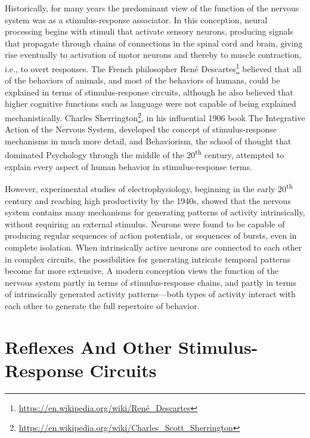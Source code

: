 \documentclass[]{book}
\let\rmarkdownfootnote\footnote%
\def\footnote{\protect\rmarkdownfootnote}
\renewcommand{\href}[2]{#2\footnote{\url{#1}}}
\begin{document}
Historically, for many years the predominant view of the function of the nervous system was as a stimulus-response associator. In this conception, neural processing begins with stimuli that activate sensory neurons, producing signals that propagate through chains of connections in the spinal cord and brain, giving rise eventually to activation of motor neurons and thereby to muscle contraction, i.e., to overt responses. The French philosopher \href{https://en.wikipedia.org/wiki/René_Descartes}{René Descartes} believed that all of the behaviors of animals, and most of the behaviors of humans, could be explained in terms of stimulus-response circuits, although he also believed that higher cognitive functions such as language were not capable of being explained mechanistically. \href{https://en.wikipedia.org/wiki/Charles_Scott_Sherrington}{Charles Sherrington}, in his influential 1906 book The Integrative Action of the Nervous System, developed the concept of stimulus-response mechanisms in much more detail, and Behaviorism, the school of thought that dominated Psychology through the middle of the 20\textsuperscript{th} century, attempted to explain every aspect of human behavior in stimulus-response terms.

However, experimental studies of electrophysiology, beginning in the early 20\textsuperscript{th} century and reaching high productivity by the 1940s, showed that the nervous system contains many mechanisms for generating patterns of activity intrinsically, without requiring an external stimulus. Neurons were found to be capable of producing regular sequences of action potentials, or sequences of bursts, even in complete isolation. When intrinsically active neurons are connected to each other in complex circuits, the possibilities for generating intricate temporal patterns become far more extensive. A modern conception views the function of the nervous system partly in terms of stimulus-response chains, and partly in terms of intrinsically generated activity patterns---both types of activity interact with each other to generate the full repertoire of behavior.

\hypertarget{reflexes-and-other-stimulus-response-circuits}{%
\section{Reflexes And Other Stimulus-Response Circuits}\label{reflexes-and-other-stimulus-response-circuits}}
\end{document}
